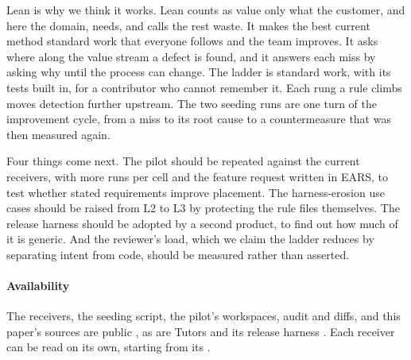 Lean is why we think it works. Lean counts as value only what the customer, and here the
domain, needs, and calls the rest waste. It makes the best current method standard work that
everyone follows and the team improves. It asks where along the value stream a defect is found,
and it answers each miss by asking why until the process can change. The ladder is standard
work, with its tests built in, for a contributor who cannot remember it. Each rung a rule climbs
moves detection further upstream. The two seeding runs are one turn of the improvement cycle,
from a miss to its root cause to a countermeasure that was then measured again.

Four things come next. The pilot should be repeated against the current receivers, with more
runs per cell and the feature request written in EARS, to test whether stated requirements
improve placement. The harness-erosion use cases should be raised from L2 to L3 by protecting
the rule files themselves. The release harness should be adopted by a second product, to find
out how much of it is generic. And the reviewer's load, which we claim the ladder reduces by
separating intent from code, should be measured rather than asserted.

\paragraph{Availability} The receivers, the seeding script, the pilot's workspaces, audit and
diffs, and this paper's sources are public \citep{taskboardrepo}, as are Tutors and its release
harness \citep{tutorsmonorepo,tutorsreleaseharness}. Each receiver can be read on its own,
starting from its .
